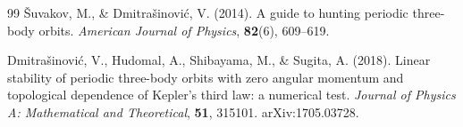 \documentclass[11pt,a4paper]{article}
\begin{document}
\begin{thebibliography}{99}
{\v{S}}uvakov, M., \& Dmitra{\v{s}}inovi{\'c}, V. (2014).
A guide to hunting periodic three-body orbits.
\textit{American Journal of Physics}, \textbf{82}(6), 609--619.

Dmitra{\v{s}}inovi{\'c}, V., Hudomal, A., Shibayama, M., \& Sugita, A. (2018).
Linear stability of periodic three-body orbits with zero angular momentum and topological dependence of Kepler's third law: a numerical test.
\textit{Journal of Physics A: Mathematical and Theoretical}, \textbf{51}, 315101.
arXiv:1705.03728.

\end{thebibliography}
\end{document}
